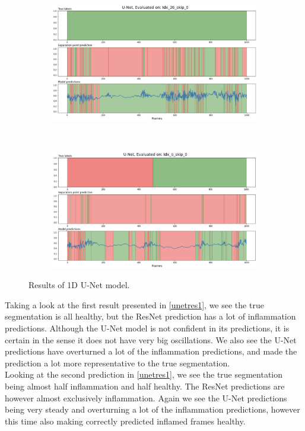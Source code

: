 \begin{figure}[H]
	\centering
	\begin{subfigure}{\linewidth}
		\centering
		\includegraphics[width=\linewidth]{Materials/Results/UNet/unet1}
	\end{subfigure}
	\\
	\begin{subfigure}{\linewidth}
		\centering
		\includegraphics[width=\linewidth]{Materials/Results/UNet/unet2}
	\end{subfigure}
	\caption{Results of 1D U-Net model.}
	\label{unetres1}
\end{figure}

Taking a look at the first result presented in \autoref{unetres1}, we see the true segmentation is all healthy, but the ResNet prediction has a lot of inflammation predictions. Although the U-Net model is not confident in its predictions, it is certain in the sense it does not have very big oscillations. We also see the U-Net predictions have overturned a lot of the inflammation predictions, and made the prediction a lot more representative to the true segmentation.\\
Looking at the second prediction in \autoref{unetres1}, we see the true segmentation being almost half inflammation and half healthy. The ResNet predictions are however almost exclusively inflammation. Again we see the U-Net predictions being very steady and overturning a lot of the inflammation predictions, however this time also making correctly predicted inflamed frames healthy.

